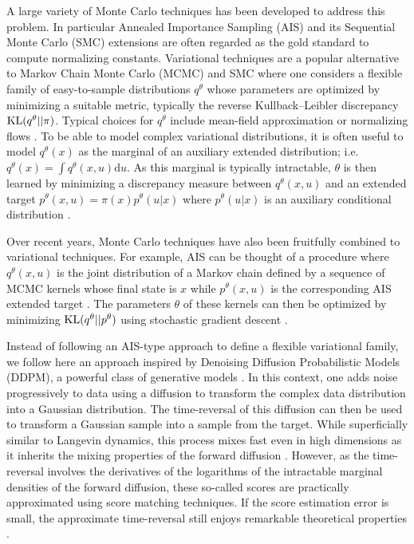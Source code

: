 \documentclass{article} %
\begin{document}
A large variety of Monte Carlo techniques has been developed to address this problem. In particular Annealed Importance Sampling (AIS) \citep{neal2001annealed} and its Sequential Monte Carlo (SMC) extensions \citep{del2006sequential} are often regarded as the gold standard to compute normalizing constants. Variational techniques are a popular alternative to Markov Chain Monte Carlo (MCMC) and SMC where one considers a flexible family of easy-to-sample distributions $q^{\theta}$ whose parameters are optimized by minimizing a suitable metric, typically the reverse Kullback--Leibler discrepancy $\mathrm{KL}(q^{\theta}||\pi)$. Typical choices for $q^{\theta}$ include mean-field approximation \citep{Wainwright:2008} or normalizing flows \citep{papamakarios2019normalizing}. To be able to model complex variational distributions, it is often useful to model $q^{\theta}(x)$ as the marginal of an auxiliary extended distribution; i.e. $q^{\theta}(x)=\int q^{\theta}(x,u)\mathrm{d}u$. As this marginal is typically intractable, $\theta$ is then learned by minimizing a discrepancy measure between $q^{\theta}(x,u)$ and an extended target $p^{\theta}(x,u)=\pi(x)p^\theta(u|x)$ where $p^\theta(u|x)$ is an auxiliary conditional distribution \citep{Agakov2004}.

Over recent years, Monte Carlo techniques have also been fruitfully combined to variational techniques. For example, AIS can be thought of a procedure where $q^{\theta}(x,u)$ is the joint distribution of a Markov chain defined by a sequence of MCMC kernels whose final state is $x$ while $p^{\theta}(x,u)$ is the corresponding AIS extended target \citep{neal2001annealed}. The parameters $\theta$ of these kernels can then be optimized by minimizing $\mathrm{KL}(q^{\theta}||p^{\theta})$ using stochastic gradient descent \citep{wunoe2020stochastic,Geffner:2021,Thin:2021,ZhangAIS2021,doucet2022annealed,geffner2022langevin}.

Instead of following an AIS-type approach to define a flexible variational family, we follow here an approach inspired by Denoising Diffusion Probabilistic Models (DDPM), a powerful class of generative models \citep{sohl2015deep,ho2020denoising,song2020score}. In this context, one adds noise progressively to data using a diffusion to transform the complex data distribution into a Gaussian distribution. The time-reversal of this diffusion can then be used to transform a Gaussian sample into a sample from the target. While superficially similar to Langevin dynamics, this process mixes fast even in high dimensions as it inherits the mixing properties of the forward diffusion \citep[Theorem 1]{debortoli2021diffusion}. However, as the time-reversal involves the derivatives of the logarithms of the intractable marginal densities of the forward diffusion, these so-called scores are practically approximated using score matching techniques. If the score estimation error is small, the approximate time-reversal still enjoys remarkable theoretical properties  \citep{debortoli2022convergence,ChenChewiSinhosamplingaseasyaslearningscore2022,lee2022convergencenocondition}.
\end{document}
